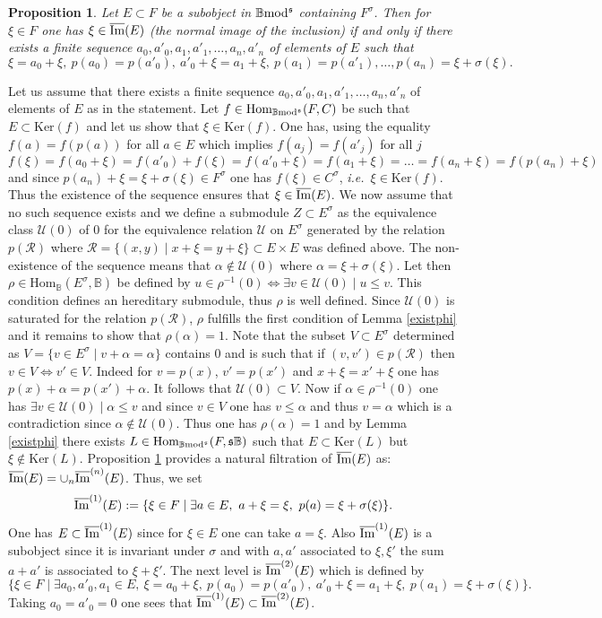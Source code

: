 \documentclass[12pt]{article}
\newtheorem{prop}[thm]{Proposition}
\def\Hom{{\rm Hom}}
\def\B{{\mathbb B}}
\def\imm{\overline{\rm Im}}
\def\cR{{\mathcal R}}
\def\cU{{\mathcal U}}
\newcommand{\ie}{{\it i.e.\/}\ }
\def\ker{{\mbox{Ker}}}
\def\Hom {{\mbox{Hom}}}
\def\yb{\mathfrak{s}}
\def\b2{{\rm \B mod^{\mathfrak s}}}
\begin{document}
\begin{prop}\label{existphi1} Let $E\subset F$ be a subobject in $\b2$ containing $F^\sigma$. Then for $\xi \in F$ one has  $\xi \in \imm(E)$ (the normal image of the inclusion) if and only if there exists a finite sequence $a_0,a'_0,a_1,a'_1,\ldots, a_n,a'_n$ of elements of $E$ such that 
 $$
 \xi=a_0+\xi,\ p(a_0)=p(a'_0),\ a'_0+\xi=a_1+\xi,\ p(a_1)=p(a'_1), \ldots, p(a_n)=\xi+\sigma(\xi).
 $$
  \end{prop}
\proof Let us assume that there exists a finite sequence $a_0,a'_0,a_1,a'_1,\ldots, a_n,a'_n$ of elements of $E$ as in the statement. Let $f\in \Hom_\b2(F,C)$ be such that $E\subset \ker(f)$ and let us show that $\xi\in \ker(f)$. One has, using the equality $f(a)=f(p(a))$ for all $a\in E$ which implies $f(a_j)=f(a'_j)$ for all $j$
$$
f(\xi)=f(a_0+\xi)=f(a'_0)+f(\xi)=f(a'_0+\xi)=f(a_1+\xi)=\ldots =f(a_n+\xi)=f(p(a_n)+\xi)
$$
 and since $p(a_n)+\xi=\xi+\sigma(\xi)\in F^\sigma$ one has $f(\xi)\in C^\sigma$, \ie $\xi\in \ker(f)$. Thus the existence of the sequence ensures that $\xi \in \imm(E)$. We now assume that no such sequence exists and we define a submodule $Z\subset E^\sigma$ as the equivalence class $\cU(0)$ of $0$ for the equivalence relation $\cU$ on $E^\sigma$ generated by the relation $p(\cR)$ where $\cR=\{(x,y)\mid x+\xi=y+\xi\}\subset E\times E$ was defined above. The non-existence of the sequence means that $\alpha\notin \cU(0)$ where $\alpha=\xi+\sigma(\xi)$. Let then $\rho\in \Hom_\B(E^\sigma,\B)$ be defined by 
 $
 u\in \rho^{-1}(0)\Leftrightarrow \exists v\in \cU(0)\mid u\leq v
 $. 
 This condition defines an hereditary submodule, thus $\rho$ is well defined. Since $\cU(0)$ is saturated for the relation $p(\cR)$, $\rho$ fulfills the first condition of Lemma \ref{existphi} and it remains to show that $\rho(\alpha)=1$. Note that the subset  $V\subset E^\sigma$ determined as $V=\{v\in E^\sigma\mid v+\alpha=\alpha\}$ contains $0$ and is such that if $(v,v')\in p(\cR)$ then $v\in V\iff v'\in V$. Indeed for $v=p(x)$, $v'=p(x')$ and $x+\xi=x'+\xi$ one has $p(x)+\alpha=p(x')+\alpha$. It follows that $\cU(0)\subset V$. Now if $\alpha\in \rho^{-1}(0)$ one has $\exists v\in \cU(0)\mid \alpha\leq v$ and since $v\in V$ one has $v\leq \alpha$ and thus $v=\alpha$ which is a contradiction since $\alpha\notin \cU(0)$. Thus one has $\rho(\alpha)=1$ and 
 by Lemma \ref{existphi} there exists $L\in \Hom_\b2(F,\yb\B)$ such that $E\subset \ker(L)$ but $\xi\notin\ker(L)$. \endproof 
Proposition \ref{existphi1}  provides a natural filtration of $\imm(E)$ as: $\imm(E)=\cup_n \imm^{(n)}(E)$. Thus, we set 
 $$
 \imm^{(1)}(E):=\{\xi\in F\mid \exists a\in E, \ a+\xi=\xi,\ p(a)=\xi+\sigma(\xi)\}.
 $$
 One has $E\subset \imm^{(1)}(E)$ since for $\xi\in E$ one can take $a=\xi$. Also $\imm^{(1)}(E)$ is a subobject since it is invariant under $\sigma$ and with $a,a'$ associated to $\xi,\xi'$ the sum $a+a'$ is associated to $\xi+\xi'$. The next level is $\imm^{(2)}(E)$ which is defined by
 $$
 \{\xi\in F\mid \exists a_0,a'_0,a_1\in E, \  \xi=a_0+\xi,\ p(a_0)=p(a'_0),\ a'_0+\xi=a_1+\xi,\ p(a_1)=\xi+\sigma(\xi)\}.
 $$
Taking $a_0=a'_0=0$ one sees that $\imm^{(1)}(E)\subset\imm^{(2)}(E)$. \vspace{.05in}
\end{document}
